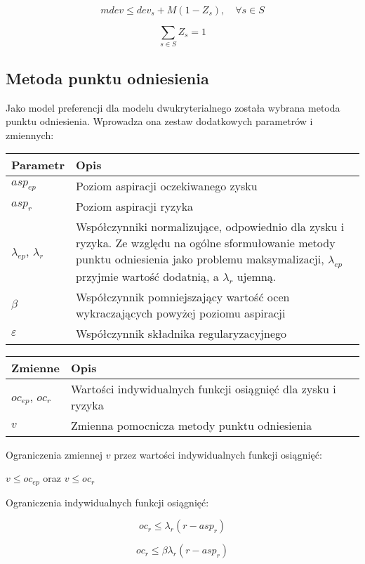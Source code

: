 \documentclass[12pt]{article}
\begin{document}
$$mdev \leqslant dev_s + M(1 - Z_s), \quad \forall s \in S$$

$$\sum_{s \in S} Z_s = 1$$

\subsection{Metoda punktu odniesienia}

Jako model preferencji dla modelu dwukryterialnego została wybrana metoda punktu odniesienia. Wprowadza ona zestaw dodatkowych parametrów i zmiennych:

\begin{table}[h!]
\centering
\begin{tabular}{|l|p{10cm}|}
\hline
Parametr & Opis \\
\hline
$asp_{ep}$ & Poziom aspiracji oczekiwanego zysku \\
\hline
$asp_r$ & Poziom aspiracji ryzyka \\
\hline
$\lambda_{ep}$, $\lambda_r$ & Współczynniki normalizujące, odpowiednio dla zysku i ryzyka. Ze względu na ogólne sformułowanie metody punktu odniesienia jako problemu maksymalizacji, $\lambda_{ep}$ przyjmie wartość dodatnią, a $\lambda_r$ ujemną. \\
\hline
$\beta$ & Współczynnik pomniejszający wartość ocen wykraczających powyżej poziomu aspiracji \\
\hline
$\varepsilon$ & Współczynnik składnika regularyzacyjnego \\
\hline
\end{tabular}

\begin{tabular}{|l|l|}
\hline
Zmienne & Opis \\
\hline
$oc_{ep}$, $oc_r$ & Wartości indywidualnych funkcji osiągnięć dla zysku i ryzyka \\
\hline
$v$ & Zmienna pomocnicza metody punktu odniesienia \\
\hline
\end{tabular}
\end{table}

Ograniczenia zmiennej $v$ przez wartości indywidualnych funkcji osiągnięć:

$v \leq oc_{ep}$ oraz $v \leq oc_r$

Ograniczenia indywidualnych funkcji osiągnięć:

$$oc_r \leqslant \lambda_r (r - asp_r)$$

$$oc_r \leqslant \beta \lambda_r (r - asp_r)$$
\end{document}
